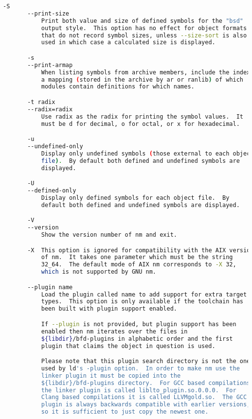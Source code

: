 {{\begin{lstlisting}[language=bash]
       -S
       --print-size
           Print both value and size of defined symbols for the "bsd"
           output style.  This option has no effect for object formats
           that do not record symbol sizes, unless --size-sort is also
           used in which case a calculated size is displayed.

       -s
       --print-armap
           When listing symbols from archive members, include the index:
           a mapping (stored in the archive by ar or ranlib) of which
           modules contain definitions for which names.

       -t radix
       --radix=radix
           Use radix as the radix for printing the symbol values.  It
           must be d for decimal, o for octal, or x for hexadecimal.

       -u
       --undefined-only
           Display only undefined symbols (those external to each object
           file).  By default both defined and undefined symbols are
           displayed.

       -U
       --defined-only
           Display only defined symbols for each object file.  By
           default both defined and undefined symbols are displayed.

       -V
       --version
           Show the version number of nm and exit.

       -X  This option is ignored for compatibility with the AIX version
           of nm.  It takes one parameter which must be the string
           32_64.  The default mode of AIX nm corresponds to -X 32,
           which is not supported by GNU nm.

       --plugin name
           Load the plugin called name to add support for extra target
           types.  This option is only available if the toolchain has
           been built with plugin support enabled.

           If --plugin is not provided, but plugin support has been
           enabled then nm iterates over the files in
           ${libdir}/bfd-plugins in alphabetic order and the first
           plugin that claims the object in question is used.

           Please note that this plugin search directory is not the one
           used by ld's -plugin option.  In order to make nm use the
           linker plugin it must be copied into the
           ${libdir}/bfd-plugins directory.  For GCC based compilations
           the linker plugin is called liblto_plugin.so.0.0.0.  For
           Clang based compilations it is called LLVMgold.so.  The GCC
           plugin is always backwards compatible with earlier versions,
           so it is sufficient to just copy the newest one.


\end{lstlisting}}}
